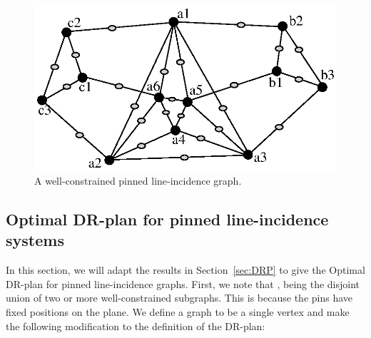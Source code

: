 \begin{figure}
  \centering
   \includegraphics[width=.8\linewidth]{img/pinned}
\caption{ A well-constrained pinned line-incidence graph.}
\label{fig:pinned_line}
\end{figure}


\subsection{Optimal DR-plan for pinned line-incidence systems}


In this section, we will adapt the results in Section~\ref{sec:DRP}
to give the Optimal DR-plan for pinned line-incidence graphs.
First, we note that %
,
being the disjoint union of two or more well-constrained subgraphs.
This is because the pins have fixed positions on the plane.
%
%
%
%
%
%
%
We define a  graph to be a single vertex and make the following modification to the definition of the DR-plan:

